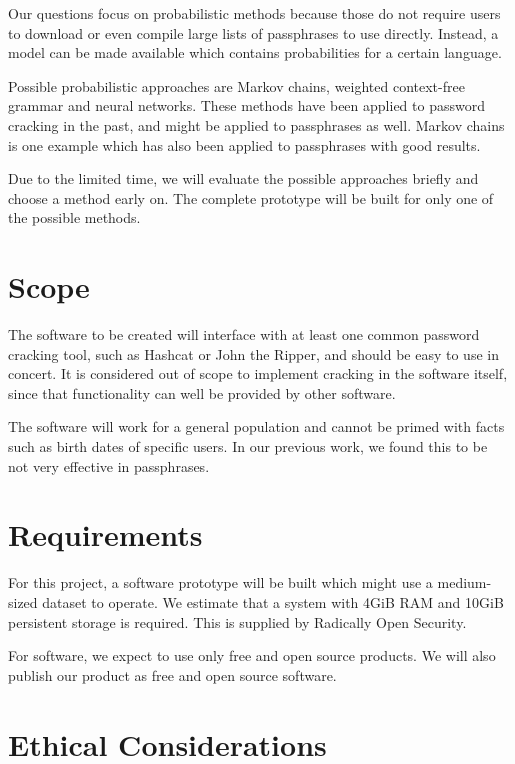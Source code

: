 \documentclass{article}
\begin{document}
Our questions focus on probabilistic methods because those do not require users
to download or even compile large lists of passphrases to use directly.
Instead, a model can be made available which contains probabilities for a
certain language.

Possible probabilistic approaches are Markov chains, weighted context-free
grammar and neural networks. These methods have been applied to password
cracking in the past, and might be applied to passphrases as well. Markov
chains is one example which has also been applied to
passphrases\cite{sparell-simovits} with good results.

Due to the limited time, we will evaluate the possible approaches briefly and
choose a method early on. The complete prototype will be built for only one of
the possible methods.


\section{Scope}

The software to be created will interface with at least one common password
cracking tool, such as Hashcat or John the Ripper, and should be easy to use in
concert. It is considered out of scope to implement cracking in the software
itself, since that functionality can well be provided by other software.

The software will work for a general population and cannot be primed with facts
such as birth dates of specific users. In our previous work\cite{own}, we found
this to be not very effective in passphrases.


\section{Requirements}

For this project, a software prototype will be built which might use a
medium-sized dataset to operate. We estimate that a system with 4GiB RAM and
10GiB persistent storage is required. This is supplied by Radically Open
Security.

For software, we expect to use only free and open source products. We will also
publish our product as free and open source software.


\newpage
\section{Ethical Considerations}
\end{document}
